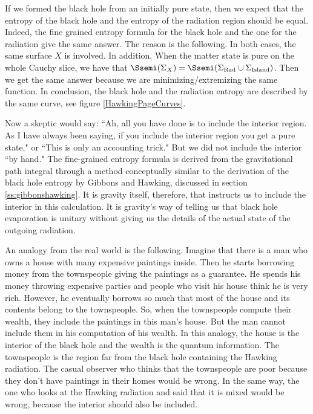  
If we formed the black hole from an initially pure state, then we expect that the entropy of the black hole and the entropy of the radiation  region should be equal. 
 Indeed, the fine grained entropy formula for the black hole and the one for the radiation give the same answer. The reason is the following. In both cases,  the same surface $X$ is involved. In addition, When the matter state is pure on the whole Cauchy slice,  we have that 
  $\Ssemi(\Sigma_X) = \Ssemi(\Sigma_\textup{Rad} \cup \Sigma_\textup{Island})$. Then we get the same answer because we are minimizing/extremizing the same function. 
 In conclusion, the black hole and the radiation entropy are described by the same curve, see figure \ref{HawkingPageCurves}. 


 

Now a skeptic would say: ``Ah, all you have done is to include the interior region. As I have always been saying, if you include the interior region you get a pure state,"  or ``This is only an accounting trick." But we did not include the interior ``by hand." The  fine-grained entropy formula is derived from the gravitational path integral through a method conceptually similar to the derivation of the black hole entropy by Gibbons and Hawking, discussed in section \ref{ss:gibbonshawking}. It is gravity itself, therefore, that instructs us to include the interior in this calculation. 
It is gravity's way of telling us that black hole evaporation is unitary without giving us the details of the actual state of the outgoing radiation.





An analogy from the real world is the following. Imagine that there is a man who owns a house with many expensive paintings inside. Then he starts borrowing money from the townspeople giving the paintings as a guarantee. He spends his money throwing expensive parties and people who visit his house think he is very rich. However, he eventually borrows so much that most of the house and its contents belong to the townspeople. So, when the townspeople  compute their wealth, they include the paintings in this man's house. But the man cannot include them in his computation of his wealth. 
In this analogy, the house is the interior of the black hole and the wealth is the quantum information. The townspeople is the region far from the black hole containing the Hawking radiation.  The casual observer who thinks that the townspeople are poor because they don't have paintings in their homes would be wrong.  In the same way,  the one who looks at the Hawking radiation and said that it is mixed would be wrong, because the interior should also be included. 
 

 
  


